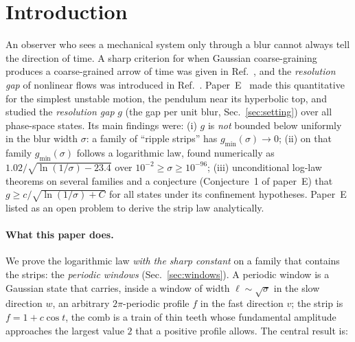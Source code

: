 \section{Introduction}
\label{sec:intro}

An observer who sees a mechanical system only through a blur cannot always tell the direction of time. A sharp criterion for when Gaussian
coarse-graining produces a coarse-grained arrow of time was given in Ref.~\cite{paperA}, and the \emph{resolution gap} of nonlinear flows was introduced in
Ref.~\cite{paperB}. Paper~E~\cite{paperE} made this
quantitative for the simplest unstable motion, the pendulum near its hyperbolic top, and studied the \emph{resolution gap}
$g$ (the gap per unit blur, Sec.~\ref{sec:setting}) over all phase-space states. Its main findings were:
(i) $g$ is \emph{not} bounded below uniformly in the blur width $\sigma$: a family of ``ripple strips'' has $g_{\min}(\sigma)\to0$;
(ii) on that family $g_{\min}(\sigma)$ follows a logarithmic law, found numerically as $1.02/\sqrt{\ln(1/\sigma)-23.4}$ over
$10^{-2}\ge\sigma\ge10^{-96}$; (iii) unconditional log-law theorems on several families and a conjecture (Conjecture~1 of paper~E)
that $g\ge c/\sqrt{\ln(1/\sigma)+C}$ for all states under its confinement hypotheses. Paper~E listed as an open problem to derive the
strip law analytically.

\paragraph*{What this paper does.}
We prove the logarithmic law \emph{with the sharp constant} on a family that contains the strips: the \emph{periodic windows}
(Sec.~\ref{sec:windows}). A periodic window is a Gaussian state that carries, inside a window of width $\ell\sim\sqrt\sigma$ in the
slow direction $w$, an arbitrary $2\pi$-periodic profile $f$ in the fast direction $v$; the strip is $f=1+c\cos t$, the comb is a
train of thin teeth whose fundamental amplitude approaches the largest value $2$ that a positive profile allows.
The central result is:

